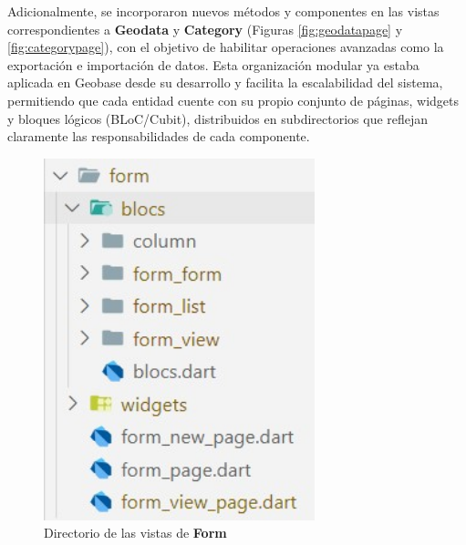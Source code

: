 \documentclass[12pt, a4paper]{book}
\begin{document}
Adicionalmente, se incorporaron nuevos métodos y componentes en las vistas correspondientes a \textbf{Geodata} y \textbf{Category} (Figuras \ref{fig:geodatapage} y \ref{fig:categorypage}), con el objetivo de habilitar operaciones avanzadas como la exportación e importación de datos. Esta organización modular ya estaba aplicada en Geobase desde su desarrollo y facilita la escalabilidad del sistema, permitiendo que cada entidad cuente con su propio conjunto de páginas, widgets y bloques lógicos (BLoC/Cubit), distribuidos en subdirectorios que reflejan claramente las responsabilidades de cada componente.

\begin{figure}[H]
  \centering
  \begin{minipage}[b]{0.32\textwidth}
    \centering
    \includegraphics[width=0.7\textwidth]{images/form_page.jpg}
    \caption{Directorio de las vistas de \textbf{Form}}
    \label{fig:formpage}
  \end{minipage}
  \hspace{0.02\textwidth}
  \begin{minipage}[b]{0.3\textwidth}
    \centering

\end{minipage}
\end{figure}
\end{document}
